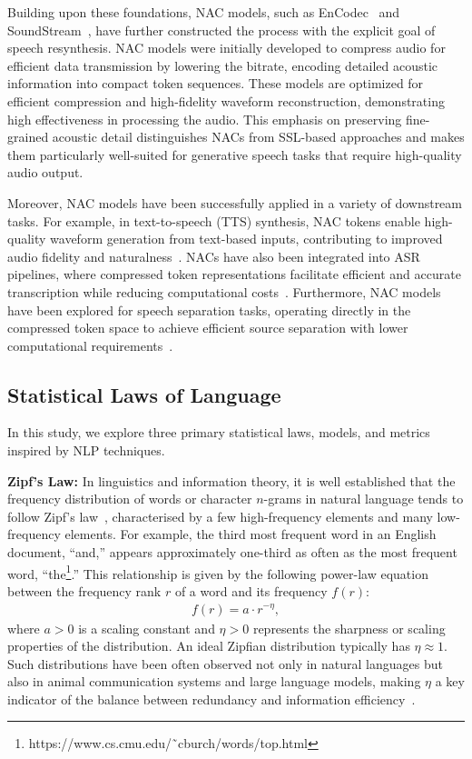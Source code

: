 \documentclass[conference]{IEEEtran}
\begin{document}
Building upon these foundations, NAC models, such as EnCodec~\cite{defossez2023high} and SoundStream~\cite{Zeghidour2021SoundStreamAE}, have further constructed the process with the explicit goal of speech resynthesis. NAC models were initially developed to compress audio for efficient data transmission by lowering the bitrate, encoding detailed acoustic information into compact token sequences. These models are optimized for efficient compression and high-fidelity waveform reconstruction, demonstrating high effectiveness in processing the audio. This emphasis on preserving fine-grained acoustic detail distinguishes NACs from SSL-based approaches and makes them particularly well-suited for generative speech tasks that require high-quality audio output.

Moreover, NAC models have been successfully applied in a variety of downstream tasks. For example, in text-to-speech (TTS) synthesis, NAC tokens enable high-quality waveform generation from text-based inputs, contributing to improved audio fidelity and naturalness~\cite{defossez2023high, Zeghidour2021SoundStreamAE}. NACs have also been integrated into ASR pipelines, where compressed token representations facilitate efficient and accurate transcription while reducing computational costs~\cite{dhawan2024codec}. Furthermore, NAC models have been explored for speech separation tasks, operating directly in the compressed token space to achieve efficient source separation with lower computational requirements~\cite{yip2024towards}. 
\vspace{-2mm}
\subsection{Statistical Laws of Language}

In this study, we explore three primary statistical laws, models, and metrics inspired by NLP techniques.

\vspace{0.5em}\noindent\textbf{Zipf's Law:\:} In linguistics and information theory, it is well established that the frequency distribution of words or character $n$-grams in natural language tends to follow Zipf's law~\cite{zipf1949human}, characterised by a few high-frequency elements and many low-frequency elements. For example, the third most frequent word in an English document, ``and,'' appears approximately one-third as often as the most frequent word, ``the\footnote{https://www.cs.cmu.edu/˜cburch/words/top.html}.'' This relationship is given by the following power-law equation between the frequency rank $r$ of a word and its frequency $f(r)$:
\vspace{-2mm}
\begin{align}
f(r) = a \cdot r^{-\eta},
\end{align}
where $a>0$ is a scaling constant and $\eta>0$ represents the sharpness or scaling properties of the distribution. An ideal Zipfian distribution typically has $\eta \approx 1$. Such distributions have been often observed not only in natural languages but also in animal communication systems and large language models, making $\eta$ a key indicator of the balance between redundancy and information efficiency~\cite{mandelbrot1953contribution, gelbukh2001zipf}.
\end{document}

